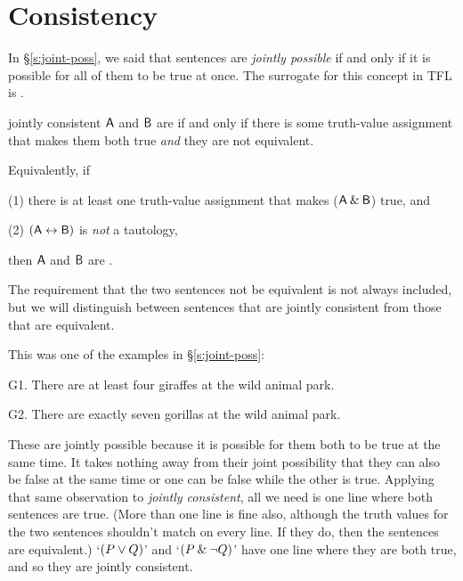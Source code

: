 \section{Consistency}\label{consistency--tt}
In \S\ref{s:joint-poss}, we said that sentences are \textit{jointly possible} if and only if it is possible for all of them to be true at once. The surrogate for this concept in TFL is . 

\begin{factboxy}{jointly consistent}
$\mathsf{A}$ and $\mathsf{B}$ are  if and only if there is some truth-value assignment that makes them both true \textit{and} they are not equivalent.
\medskip
		
Equivalently, if
\begin{earg}
\vspace{-2mm}
	\item[(1)] there is at least one truth-value assignment that makes ($\mathsf{A}\mathbin{\&}\mathsf{B}$) true, and
	\item[(2)] $(\mathsf{A} \leftrightarrow \mathsf{B})$ is \textit{not} a tautology,
\vspace{-2mm}
\end{earg}		
then $\mathsf{A}$ and $\mathsf{B}$ are .
\end{factboxy}

\noindent The requirement that the two sentences not be equivalent is not always included, but we will distinguish between sentences that are jointly consistent from those that are equivalent. 

This was one of the examples in \S\ref{s:joint-poss}:
\begin{ebullet}	
		\item[G1.] There are at least four giraffes at the wild animal park.
		\item[G2.] There are exactly seven gorillas at the wild animal park.
	\end{ebullet}
These are jointly possible because it is possible for them both to be true at the same time. It takes nothing away from their joint possibility that they can also be false at the same time or one can be false while the other is true. Applying that same observation to \textit{jointly consistent}, all we need is one line where both sentences are true. (More than one line is fine also, although the truth values for the two sentences shouldn't match on every line. If they do, then the sentences are equivalent.) `$(P \vee Q)$' and `$(P \mathbin{\&} {\neg} Q)$' have one line where they are both true, and so they are jointly consistent. 

